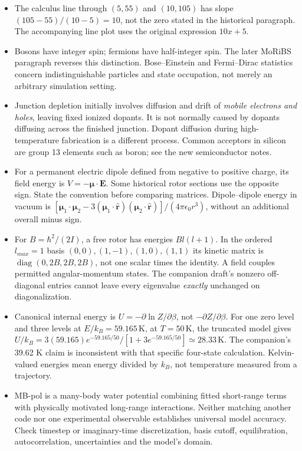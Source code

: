 \documentclass{article}
\begin{document}
\begin{itemize}
\item The calculus line through $(5,55)$ and $(10,105)$ has slope $(105-55)/(10-5)=10$, not the zero stated in the historical paragraph. The accompanying line plot uses the original expression $10x+5$.
\item Bosons have integer spin; fermions have half-integer spin. The later MoRiBS paragraph reverses this distinction. Bose--Einstein and Fermi--Dirac statistics concern indistinguishable particles and state occupation, not merely an arbitrary simulation setting.
\item Junction depletion initially involves diffusion and drift of \emph{mobile electrons and holes}, leaving fixed ionized dopants. It is not normally caused by dopants diffusing across the finished junction. Dopant diffusion during high-temperature fabrication is a different process. Common acceptors in silicon are group 13 elements such as boron; see the new semiconductor notes.
\item For a permanent electric dipole defined from negative to positive charge, its field energy is $V=-\boldsymbol\mu\cdot\mathbf E$. Some historical rotor sections use the opposite sign. State the convention before comparing matrices. Dipole--dipole energy in vacuum is $[\boldsymbol\mu_1\cdot\boldsymbol\mu_2-3(\boldsymbol\mu_1\cdot\hat{\mathbf r})(\boldsymbol\mu_2\cdot\hat{\mathbf r})]/(4\pi\epsilon_0r^3)$, without an additional overall minus sign.
\item For $B=\hbar^2/(2I)$, a free rotor has energies $Bl(l+1)$. In the ordered $l_{max}=1$ basis $(0,0),(1,-1),(1,0),(1,1)$ its kinetic matrix is $\operatorname{diag}(0,2B,2B,2B)$, not one scalar times the identity. A field couples permitted angular-momentum states. The companion draft's nonzero off-diagonal entries cannot leave every eigenvalue \emph{exactly} unchanged on diagonalization.
\item Canonical internal energy is $U=-\partial\ln Z/\partial\beta$, not $-\partial Z/\partial\beta$. For one zero level and three levels at $E/k_B=59.165\,\mathrm K$, at $T=50\,\mathrm K$, the truncated model gives $U/k_B=3(59.165)e^{-59.165/50}/[1+3e^{-59.165/50}]\simeq28.33\,\mathrm K$. The companion's 39.62 K claim is inconsistent with that specific four-state calculation. Kelvin-valued energies mean energy divided by $k_B$, not temperature measured from a trajectory.
\item MB-pol is a many-body water potential combining fitted short-range terms with physically motivated long-range interactions. Neither matching another code nor one experimental observable establishes universal model accuracy. Check timestep or imaginary-time discretization, basis cutoff, equilibration, autocorrelation, uncertainties and the model's domain.

\end{itemize}
\end{document}
